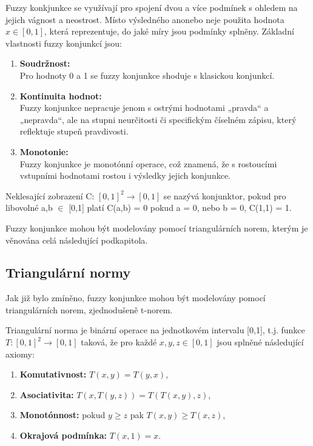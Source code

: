 Fuzzy konkjunkce se využívají pro spojení dvou a více podmínek s ohledem na jejich vágnost a neostrost. Místo výsledného \clqq ano\crqq \space nebo \clqq ne\crqq \space je použita hodnota  $x \in [0,1]$, která reprezentuje, do jaké míry jsou podmínky splněny.  
Základní vlastnosti fuzzy konjunkcí jsou:
\begin{enumerate}
    \item \textbf{Soudržnost:}\\
    Pro hodnoty 0 a 1 se fuzzy konjunkce shoduje s klasickou konjunkcí.
    \item \textbf{Kontinuita hodnot:}\\
    Fuzzy konjunkce nepracuje jenom s  ostrými hodnotami „pravda“ a „nepravda“, ale na stupni neurčitosti či specifickým číselném zápisu, který reflektuje stupeň pravdivosti.
    \item \textbf{Monotonie:}\\
    Fuzzy konjunkce je monot\'onní operace, což znamená, že s rostoucími vstupními hodnotami rostou i výsledky jejich konjunkce.
\end{enumerate}
\begin{definition}
    \cite{KMP}
    Neklesající zobrazení C: $[0,1]^2 \rightarrow [0,1]$ se nazývá konjunktor, pokud pro libovolné a,b $\in$ [0,1] platí
    C(a,b) = 0 pokud a = 0, nebo b = 0,
    C(1,1) = 1.
    \end{definition}

\begin{remark}
    Fuzzy konjunkce mohou být modelovány pomocí triangulárních norem, kterým je věnována celá následující podkapitola.
\end{remark}

\subsection{Triangul\'arn\'i normy} 

Jak již bylo zmíněno, fuzzy konjunkce mohou být modelov\' any pomocí triangulárních norem, zjednodušeně t-norem. 
\begin{definition}
\cite{KMP}
    Triangulární norma je binární operace na jednotkovém intervalu [0,1], t.j. funkce $T: [0,1]^2 \rightarrow [0,1]$ taková, že pro každé $x, y, z \in [0,1]$ jsou splněné následující axiomy:
    \begin{enumerate}
        \item \textbf{Komutativnost:} $T(x,y) = T(y,x)$,
        \item \textbf{Asociativita:} $T(x, T(y, z)) = T(T(x, y), z)$,
        \item \textbf{Monotónnost:} pokud $y \geq z$ pak $T(x, y) \geq T(x, z)$,
        \item \textbf{Okrajová podmínka:} $T(x, 1) = x$.
    \end{enumerate}
\end{definition}

